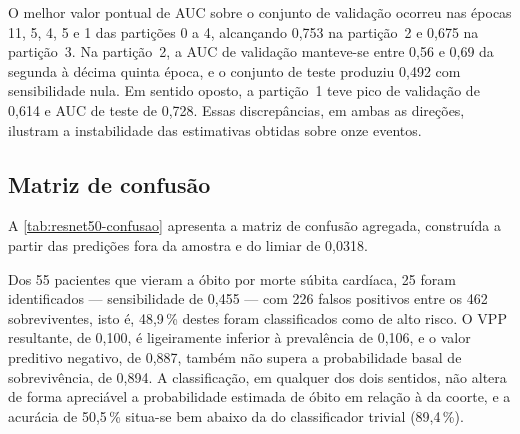 O melhor valor pontual de \gls{AUC} sobre o conjunto de validação ocorreu nas
épocas 11, 5, 4, 5 e 1 das partições 0 a 4, alcançando 0,753 na partição~2 e
0,675 na partição~3. Na partição~2, a \gls{AUC} de validação manteve-se entre
0,56 e 0,69 da segunda à décima quinta época, e o conjunto de teste produziu
0,492 com sensibilidade nula. Em sentido oposto, a partição~1 teve pico de
validação de 0,614 e \gls{AUC} de teste de 0,728. Essas discrepâncias, em
ambas as direções, ilustram a instabilidade das estimativas obtidas sobre
onze eventos.

\subsection{Matriz de confusão}
\label{subsec:confusao-resnet50}

A \autoref{tab:resnet50-confusao} apresenta a matriz de confusão agregada,
construída a partir das predições fora da amostra e do limiar de 0,0318.

\begin{table}[h!]
	\captionsetup{width=11cm}
\end{table}

Dos 55 pacientes que vieram a óbito por morte súbita cardíaca, 25 foram
identificados --- sensibilidade de 0,455 --- com 226 falsos positivos entre os
462 sobreviventes, isto é, 48,9\,\% destes foram classificados como de alto
risco. O \gls{VPP} resultante, de 0,100, é ligeiramente inferior à prevalência
de 0,106, e o valor preditivo negativo, de 0,887, também não supera a
probabilidade basal de sobrevivência, de 0,894. A classificação, em qualquer
dos dois sentidos, não altera de forma apreciável a probabilidade estimada de
óbito em relação à da coorte, e a acurácia de 50,5\,\% situa-se bem abaixo da
do classificador trivial (89,4\,\%).

